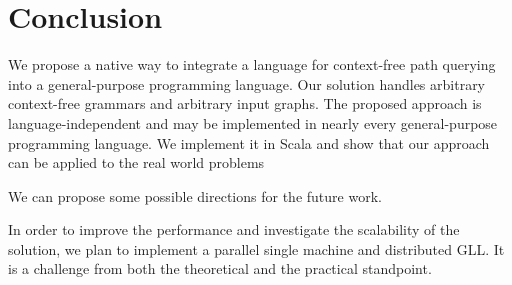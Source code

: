 \section{Conclusion}
\label{sec:conclusion}

We propose a native way to integrate a language for context-free path querying into a general-purpose programming language.
Our solution handles arbitrary context-free grammars and arbitrary input graphs.
The proposed approach is language-independent and may be implemented in nearly every general-purpose programming language.
We implement it in Scala and show that our approach can be applied to the real world problems


We can propose some possible directions for the future work.

%
In order to improve the performance and investigate the scalability of the solution, we plan to implement a parallel single machine and distributed GLL. 
It is a challenge from both the theoretical and the practical standpoint.


